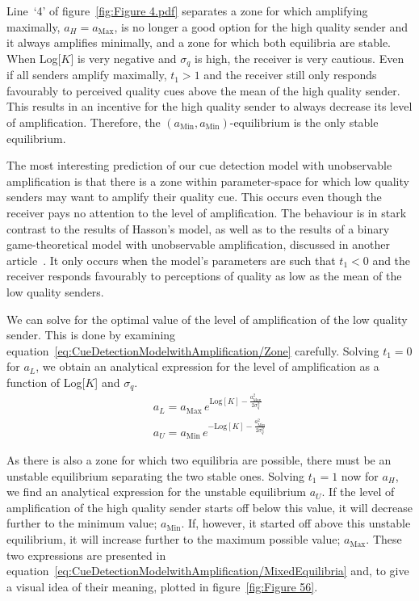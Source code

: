 \documentclass[a4paper,12pt]{article}
\numberwithin{equation}{section}
\numberwithin{figure}{section}
\begin{document}
Line~`4' of figure~\ref{fig:Figure 4.pdf} separates a zone for which amplifying maximally, $a_{H}=a_{\text{Max}}$, is no longer a good option for the high quality sender and it always amplifies minimally, and a zone for which both equilibria are stable. When Log[$K$] is very negative and $\sigma_{q}$ is high, the receiver is very cautious. Even if all senders amplify maximally, $t_{1}>1$ and the receiver still only responds favourably to perceived quality cues above the mean of the high quality sender. This results in an incentive for the high quality sender to always decrease its level of amplification. Therefore, the $(a_{\text{Min}},a_{\text{Min}})$-equilibrium is the only stable equilibrium.

The most interesting prediction of our cue detection model with unobservable amplification is that there is a zone within parameter-space for which low quality senders may want to amplify their quality cue. This occurs even though the receiver pays no attention to the level of amplification. The behaviour is in stark contrast to the results of Hasson's model, as well as to the results of a binary game-theoretical model with unobservable amplification, discussed in another article~\cite{Hasson1989, Bogaardt2016a}. It only occurs when the model's parameters are such that $t_{1}<0$ and the receiver responds favourably to perceptions of quality as low as the mean of the low quality senders.

We can solve for the optimal value of the level of amplification of the low quality sender. This is done by examining equation~\ref{eq:CueDetectionModelwithAmplification/Zone} carefully. Solving $t_{1}=0$ for $a_{L}$, we obtain an analytical expression for the level of amplification as a function of Log[$K$] and $\sigma_{q}$.
\begin{subequations}
\label{eq:CueDetectionModelwithAmplification/MixedEquilibria}
\begin{gather}
a_{L}=a_{\text{Max}} \, e^{\text{Log}[K]-\frac{a_{\text{Max}}^{2}}{2 \sigma_{q}^{2}}}\\
a_{U}=a_{\text{Min}} \, e^{-\text{Log}[K]-\frac{a_{\text{Min}}^{2}}{2 \sigma_{q}^{2}}}
\end{gather}
\end{subequations}

As there is also a zone for which two equilibria are possible, there must be an unstable equilibrium separating the two stable ones. Solving $t_{1}=1$ now for $a_{H}$, we find an analytical expression for the unstable equilibrium $a_{U}$. If the level of amplification of the high quality sender starts off below this value, it will decrease further to the minimum value; $a_{\text{Min}}$. If, however, it started off above this unstable equilibrium, it will increase further to the maximum possible value; $a_{\text{Max}}$. These two expressions are presented in equation~\ref{eq:CueDetectionModelwithAmplification/MixedEquilibria} and, to give a visual idea of their meaning, plotted in figure~\ref{fig:Figure 56}.
\end{document}
